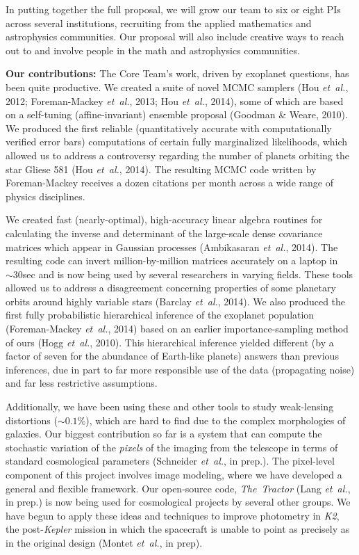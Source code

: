\documentclass[11pt]{article}
\newcommand{\foreign}[1]{\textsl{#1}}
\newcommand{\etal}{\foreign{et~al.}}
\newcommand{\project}[1]{\textsl{#1}}
\renewcommand{\paragraph}[1]{\smallskip\par\noindent\textbf{{#1}:}}
\begin{document}
In putting together the full proposal, we will grow our team to six or
eight PIs across several institutions, recruiting from the applied
mathematics and astrophysics communities.
Our proposal will also include creative ways to reach out to and involve
people in the math and astrophysics communities.

\paragraph{Our contributions}
The Core Team's work, driven by exoplanet questions,
has been quite productive.
We created a suite of novel MCMC samplers 
(Hou \etal, 2012; Foreman-Mackey \etal, 2013; Hou \etal,
2014), some of which are based on a self-tuning (affine-invariant)
ensemble proposal (Goodman \& Weare, 2010).
We produced the first reliable (quantitatively accurate with
computationally verified error bars) computations of certain fully
marginalized likelihoods, which allowed us to address a controversy
regarding the number of planets orbiting the star Gliese 581 (Hou \etal,
2014).
The resulting MCMC code written by Foreman-Mackey receives a dozen
citations per month across a wide range of physics disciplines.

We created fast (nearly-optimal), high-accuracy linear algebra
routines for calculating the inverse and determinant of the large-scale
dense covariance matrices which appear in Gaussian processes
(Ambikasaran \etal, 2014).
The resulting code can invert million-by-million matrices
accurately on a laptop in $\sim 30$sec and is now being used by
several researchers in varying fields.
These tools allowed us to address a disagreement concerning properties
of some planetary orbits around highly variable stars (Barclay \etal,
2014).
We also produced the first fully probabilistic hierarchical inference of
the exoplanet population (Foreman-Mackey \etal, 2014) based on an
earlier importance-sampling method of ours (Hogg \etal, 2010).
This hierarchical inference yielded different (by a factor of seven for
the abundance of Earth-like planets) answers than previous inferences,
due in part to far more responsible use of the data (propagating noise)
and far less restrictive assumptions.

Additionally, we have been using these and other tools to study
weak-lensing distortions ($\sim 0.1\%$), which are hard to find
due to the complex morphologies of galaxies.
Our biggest contribution so far is a system
that can compute the stochastic variation of the \emph{pixels} of the
imaging from the telescope in terms of standard cosmological parameters
(Schneider \etal, in prep.).
The pixel-level component of this project involves image modeling,
where we have developed a general and flexible framework.
Our open-source code, \project{The~Tractor} (Lang \etal,
in prep.) is now being used for cosmological projects by several other groups.
We have begun to apply these ideas and techniques to 
improve photometry in \project{K2}, the
post-\project{Kepler} mission in which the spacecraft is unable to point
as precisely as in the original design (Montet \etal, in prep).
\end{document}
